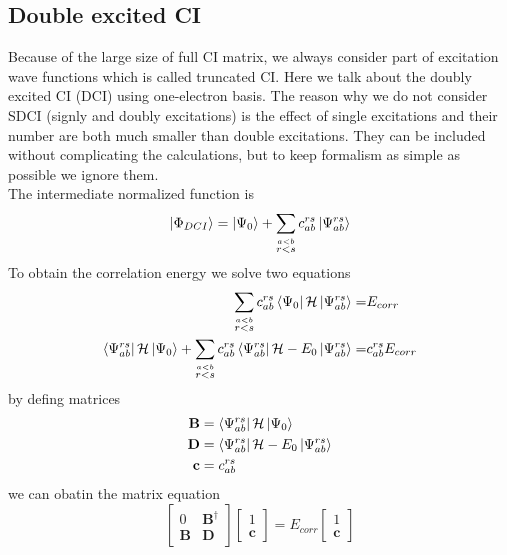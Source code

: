\documentclass[11pt]{article}
\begin{document}
\subsection{Double excited CI}
Because of the large size of full CI matrix, we always consider part of excitation wave functions which is called truncated CI. Here we talk about the doubly excited CI (DCI) using one-electron basis. The reason why we do not consider SDCI (signly and doubly excitations)
is the effect of single excitations and their number are both much smaller than double excitations. They can be included without 
complicating the calculations, but to keep formalism as simple as possible we ignore them.\\
The intermediate normalized function is
\begin{gather}
    \ket{\Phi_{DCI}}=\ket{\Psi_0}+\sum_{\stackrel{a<b}{r<s}}c_{ab}^{rs}\ket{\Psi_{ab}^{rs}}
\end{gather}
To obtain the correlation energy we solve two equations
\begin{equation}
    \begin{split}
        \sum_{\stackrel{a<b}{r<s}}c_{ab}^{rs}\bra{\Psi_0}\mathcal{H}\ket{\Psi_{ab}^{rs}}=&E_{corr}\\
        \bra{\Psi_{ab}^{rs}}\mathcal{H}\ket{\Psi_0}+\sum_{\stackrel{a<b}{r<s}}c_{ab}^{rs}\bra{\Psi_{ab}^{rs}}\mathcal{H}-E_0\ket{\Psi_{ab}^{rs}}=&c_{ab}^{rs}E_{corr}
    \end{split}
\end{equation}
by defing matrices
\begin{equation}
    \begin{split}
        \mathbf{B}&=\bra{\Psi_{ab}^{rs}}\mathcal{H}\ket{\Psi_0}\\
        \mathbf{D}&=\bra{\Psi_{ab}^{rs}}\mathcal{H}-E_0\ket{\Psi_{ab}^{rs}}\\
        \mathbf{c}&=c_{ab}^{rs}
    \end{split}
\end{equation}
we can obatin the matrix equation
\begin{equation}
    \begin{bmatrix}
        0&\mathbf{B}^\dagger\\
        \mathbf{B}&\mathbf{D}
    \end{bmatrix}
    \begin{bmatrix}
        1\\
        \mathbf{c}
    \end{bmatrix}
    =E_{corr}
    \begin{bmatrix}
        1\\
        \mathbf{c}
    \end{bmatrix}
\end{equation}
\end{document}
